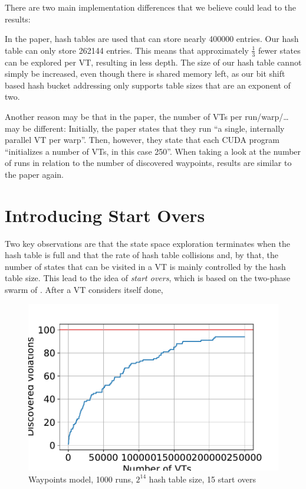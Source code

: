 \documentclass[
fancyheadings, %
%
%
]{stsreprt}
\begin{document}
There are two main implementation differences that we believe could lead to the results:

In the paper, hash tables are used that can store nearly \num{400000} entries.
Our hash table can only store \num{262144} entries.
This means that approximately $\frac{1}{3}$ fewer states can be explored per VT, resulting in less depth.
The size of our hash table cannot simply be increased, even though there is shared memory left, as our bit shift based hash bucket addressing only supports table sizes that are an exponent of two.

Another reason may be that in the paper, the number of VTs per run/warp/\dots may be different:
Initially, the paper states that they run \enquote{a single, internally parallel VT per warp}.
Then, however, they state that each CUDA program \enquote{initializes a number of VTs, in this case 250}.
When taking a look at the number of runs in relation to the number of discovered waypoints, results are similar to the paper again.


\section{Introducing Start Overs}

Two key observations are that the state space exploration terminates when the hash table is full and that the rate of hash table collisions and, by that, the number of states that can be visited in a VT is mainly controlled by the hash table size.
This lead to the idea of \emph{start overs}, which is based on the two-phase swarm of \cite{DeFrancisco2020.Grapple}.
After a VT considers itself done,

\begin{figure}[h]
    \centering
    \includegraphics[width=.5\textwidth]{figures/experiments/output2-discovered-violations-abs-numbers.pdf}
    \caption{Waypoints model, \num{1000} runs, $2^{14}$ hash table size, 15 start overs}
    \label{fig:experiments:output2}
\end{figure}
\end{document}

